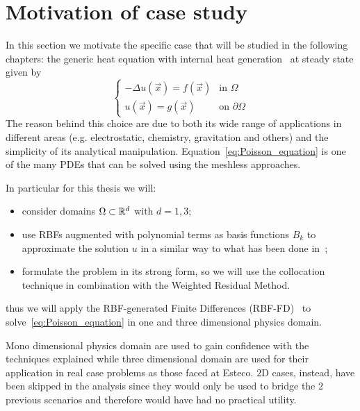 \section{Motivation of case study}
\label{sec:motivation_of_case_study}
In this section we motivate the specific case that will be studied in the following chapters: the generic heat equation with internal heat generation~\cite{Brezis:functional_analysis_book} at steady state given by
\begin{equation}
	\label{eq:Poisson_equation}
	\begin{cases}
		- \Delta u(\vec{x}) = f(\vec{x})														 &  \text{in $\Omega$}							\\
		u(\vec{x}) = g(\vec{x})  																		&  \text{on $\partial\Omega$}
	\end{cases}
\end{equation}
The reason behind this choice are due to both its wide range of applications in different areas	(e.g. electrostatic, chemistry, gravitation and others) and the simplicity of its analytical manipulation. Equation~\eqref{eq:Poisson_equation} is one of the many PDEs that can be solved using the meshless approaches.

In particular for this thesis we will:
\begin{itemize}
	\item consider domains $\Omega \subset \mathbb{R}^{d}$ with $d=1,3$;
	\item use RBFs augmented with polynomial terms as basis functions $B_k$ to approximate the solution $u$ in a similar way to what has been done in~\cite{Liu:Intro_to_meshfree_methods}; 
	\item formulate the problem in its strong form, so we will use the collocation technique in combination with the Weighted Residual Method.
\end{itemize}
thus we will apply the RBF-generated Finite Differences (RBF-FD)~\cite{Fornberg:RBF-FD_1, Fornberg:RBF-FD_2} to solve~\eqref{eq:Poisson_equation} in one and three dimensional physics domain.

Mono dimensional physics domain are used to gain confidence with the techniques explained while three dimensional  domain are used for their application in real case problems as those faced at Esteco. $2$D cases, instead, have been skipped in the analysis since they would only be used to bridge the 2 previous scenarios and therefore would have had no practical utility.

